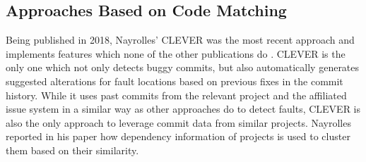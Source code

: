 




\subsection{Approaches Based on Code Matching}%
\label{sec:codematching}
\label{sec:comparison-codematching}

Being published in 2018, Nayrolles' CLEVER was the most recent approach and implements features which none of the other publications do \cite{Nayrolles2018}. CLEVER is the only one which not only detects buggy commits, but also automatically generates suggested alterations for fault locations based on previous fixes in the commit history. While it uses past commits from the relevant project and the affiliated issue system in a similar way as other approaches do to detect faults, CLEVER is also the only approach to leverage commit data from similar projects. Nayrolles reported in his paper how dependency information of projects is used to cluster them based on their similarity.

